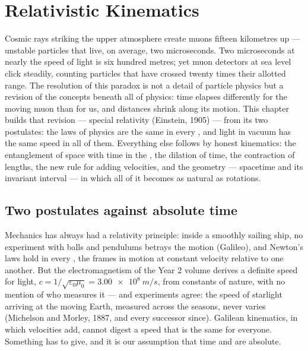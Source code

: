 \chapter{Relativistic Kinematics}\label{ch:b3:relativistic-kinematics}

Cosmic rays striking the upper atmosphere create muons fifteen
kilometres up --- unstable particles that live, on average, two
microseconds. Two microseconds at nearly the speed of light is
six hundred metres; yet muon detectors at sea level click steadily,
counting particles that have crossed twenty times their allotted
range. The resolution of this paradox is not a detail of particle
physics but a revision of the concepts beneath all of physics: time
elapses differently for the moving muon than for us, and distances
shrink along its motion. This chapter builds that revision --- special
relativity (Einstein, 1905) --- from its two postulates: the laws of
physics are the same in every , and light in vacuum has
the same speed in all of them. Everything else follows by honest
kinematics: the entanglement of space with time in the , the dilation of time, the contraction of lengths, the
new rule for adding velocities, and the geometry --- spacetime and its
invariant interval --- in which all of it becomes as natural as
rotations.

\section{Two postulates against absolute time}

\begin{remark}\label{rem:b3:relativistic-kinematics:conflict}
Mechanics has always had a relativity principle: inside a smoothly
sailing ship, no experiment with balls and pendulums betrays the
motion (Galileo), and Newton's laws hold in every \emph{}, the frames in motion at constant velocity relative to one
another. But the electromagnetism of the Year 2 volume derives a
definite speed for light, $c = 1/\sqrt{\varepsilon_0\mu_0} =
\qty{3.00e8}{m/s}$, from constants of nature, with no mention of who
measures it --- and experiments agree: the speed of starlight arriving
at the moving Earth, measured across the seasons, never varies
(Michelson and Morley, 1887, and every successor since). Galilean
kinematics, in which velocities add, cannot digest a speed that is the
same for everyone. Something has to give, and it is our assumption
that time and  are absolute.
\end{remark}


